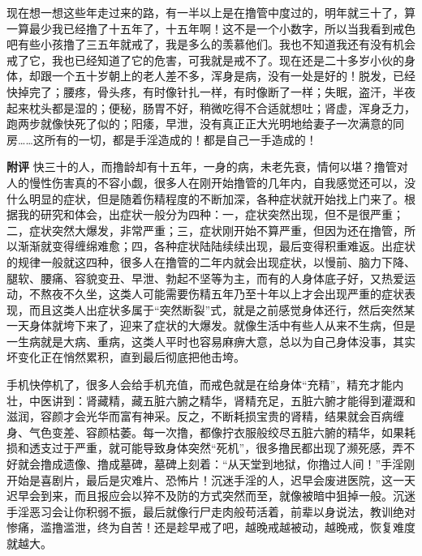 \begin{case}
    现在想一想这些年走过来的路，有一半以上是在撸管中度过的，明年就三十了，算一算最少我已经撸了十五年了，十五年啊！这不是一个小数字，所以当我看到戒色吧有些小孩撸了三五年就戒了，我是多么的羡慕他们。我也不知道我还有没有机会戒了它，我也已经知道了它的危害，可我就是戒不了。现在还是二十多岁小伙的身体，却跟一个五十岁朝上的老人差不多，浑身是病，没有一处是好的！脱发，已经快掉完了；腰疼，骨头疼，有时像针扎一样，有时像断了一样；失眠，盗汗，半夜起来枕头都是湿的；便秘，肠胃不好，稍微吃得不合适就想吐；肾虚，浑身乏力，跑两步就像快死了似的；阳痿，早泄，没有真正正大光明地给妻子一次满意的同房……这所有的一切，都是手淫造成的！都是自己一手造成的！

    \textbf{附评} 快三十的人，而撸龄却有十五年，一身的病，未老先衰，情何以堪？撸管对人的慢性伤害真的不容小觑，很多人在刚开始撸管的几年内，自我感觉还可以，没什么明显的症状，但是随着伤精程度的不断加深，各种症状就开始找上门来了。根据我的研究和体会，出症状一般分为四种：一，症状突然出现，但不是很严重；二，症状突然大爆发，非常严重；三，症状刚开始不算严重，但因为还在撸管，所以渐渐就变得缠绵难愈；四，各种症状陆陆续续出现，最后变得积重难返。出症状的规律一般就这四种，很多人在撸管的二年内就会出现症状，以慢前、脑力下降、腿软、腰痛、容貌变丑、早泄、勃起不坚等为主，而有的人身体底子好，又热爱运动，不熬夜不久坐，这类人可能需要伤精五年乃至十年以上才会出现严重的症状表现，而且这类人出症状多属于“突然断裂”式，就是之前感觉身体还行，然后突然某一天身体就垮下来了，迎来了症状的大爆发。就像生活中有些人从来不生病，但是一生病就是大病、重病，这类人平时也容易麻痹大意，总以为自己身体没事，其实坏变化正在悄然累积，直到最后彻底把他击垮。

    手机快停机了，很多人会给手机充值，而戒色就是在给身体“充精”，精充才能内壮，中医讲到：肾藏精，藏五脏六腑之精华，肾精充足，五脏六腑才能得到灌溉和滋润，容颜才会光华而富有神采。反之，不断耗损宝贵的肾精，结果就会百病缠身、气色变差、容颜枯萎。每一次撸，都像拧衣服般绞尽五脏六腑的精华，如果耗损和透支过于严重，就可能导致身体突然“死机”，很多撸民都出现了濒死感，弄不好就会撸成遗像、撸成墓碑，墓碑上刻着：“从天堂到地狱，你撸过人间！”手淫刚开始是喜剧片，最后是灾难片、恐怖片！沉迷手淫的人，迟早会废进医院，这一天迟早会到来，而且报应会以猝不及防的方式突然而至，就像被暗中狙掉一般。沉迷手淫恶习会让你积弱不振，最后就像行尸走肉般苟活着，前辈以身说法，教训绝对惨痛，滥撸滥泄，终为自苦！还是趁早戒了吧，越晚戒越被动，越晚戒，恢复难度就越大。
\end{case}


